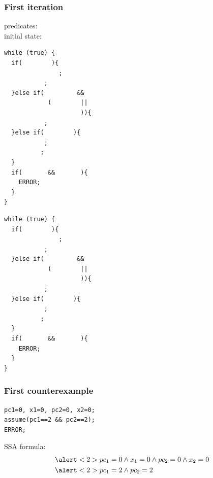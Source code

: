 \documentclass{beamer}
\begin{document}
\begin{frame}[fragile]
  \frametitle{First iteration}

{\footnotesize
predicates: \\
initial state:
}
\vfill
\begin{minipage}{0.45\linewidth}
\begin{lstlisting}
while (true) {
  if(        ){
               ;
           ;
  }else if(         &&
            (        ||
                     )){
           ;
  }else if(        ){
           ;
          ;
  }
  if(       &&       ){
    ERROR;
  }
}
\end{lstlisting}
\end{minipage}
\hfill
\begin{minipage}{0.45\linewidth}
\begin{lstlisting}
while (true) {
  if(        ){
               ;
           ;
  }else if(         &&
            (        ||
                     )){
           ;
  }else if(        ){
           ;
          ;
  }
  if(       &&       ){
    ERROR;
  }
}
\end{lstlisting}
\end{minipage}



\end{frame}

\begin{frame}[fragile]
  \frametitle{First counterexample}
\begin{minipage}{0.45\linewidth}
\begin{lstlisting}[numbers=none]
pc1=0, x1=0, pc2=0, x2=0;
assume(pc1==2 && pc2==2);
ERROR;
\end{lstlisting}
\end{minipage}
\vfill
\begin{minipage}{0.8\linewidth}
SSA formula:
\begin{align*}
& \alert<2>{pc_1=0} \land x_1=0 \land pc_2=0 \land x_2=0 \\
& \alert<2>{pc_1=2} \land pc_2=2
\end{align*}
\end{minipage}
\end{frame}
\end{document}
